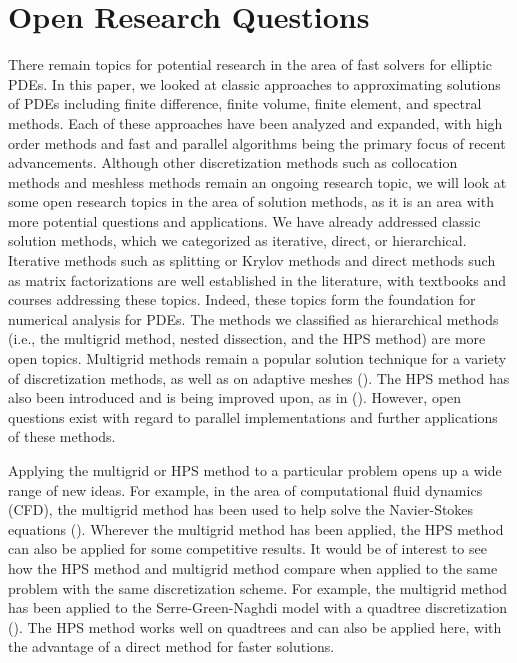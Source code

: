 \section{Open Research Questions}
\label{sec:open}

There remain topics for potential research in the area of fast solvers for elliptic PDEs. In this paper, we looked at classic approaches to approximating solutions of PDEs including finite difference, finite volume, finite element, and spectral methods. Each of these approaches have been analyzed and expanded, with high order methods and fast and parallel algorithms being the primary focus of recent advancements. Although other discretization methods such as collocation methods and meshless methods remain an ongoing research topic, we will look at some open research topics in the area of solution methods, as it is an area with more potential questions and applications. We have already addressed classic solution methods, which we categorized as iterative, direct, or hierarchical. Iterative methods such as splitting or Krylov methods and direct methods such as matrix factorizations are well established in the literature, with textbooks and courses addressing these topics. Indeed, these topics form the foundation for numerical analysis for PDEs. The methods we classified as hierarchical methods (i.e., the multigrid method, nested dissection, and the HPS method) are more open topics. Multigrid methods remain a popular solution technique for a variety of discretization methods, as well as on adaptive meshes (\cite{babich2010adaptive,thompson1989adaptive}). The HPS method has also been introduced and is being improved upon, as in (\cite{fortunato2020ultraspherical,geldermans2019adaptive,gillman2014direct,martinsson2015hierarchical}). However, open questions exist with regard to parallel implementations and further applications of these methods.

Applying the multigrid or HPS method to a particular problem opens up a wide range of new ideas. For example, in the area of computational fluid dynamics (CFD), the multigrid method has been used to help solve the Navier-Stokes equations (\cite{babich2010adaptive}). Wherever the multigrid method has been applied, the HPS method can also be applied for some competitive results. It would be of interest to see how the HPS method and multigrid method compare when applied to the same problem with the same discretization scheme. For example, the multigrid method has been applied to the Serre-Green-Naghdi model with a quadtree discretization (\cite{popinet2015quadtree}). The HPS method works well on quadtrees and can also be applied here, with the advantage of a direct method for faster solutions.

